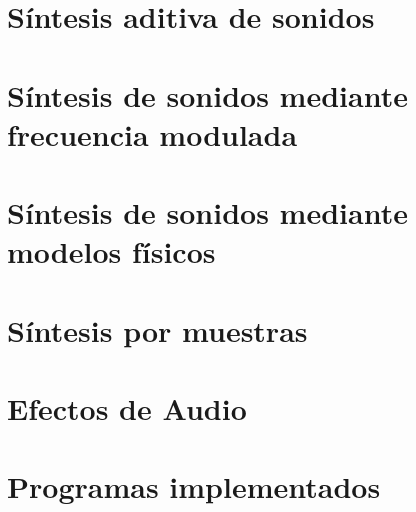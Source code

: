 







\tableofcontents
\newpage


\section{Síntesis aditiva de sonidos}
	\label{Ejercicio-2}
	

\section{Síntesis de sonidos mediante frecuencia modulada}
	\label{Ejercicio-3}
	

\section{Síntesis de sonidos mediante modelos físicos}
	\label{Ejercicio-4}
	

\section{Síntesis por muestras}
	\label{Ejercicio-5}
	

\section{Efectos de Audio}
	\label{Ejercicio-6}
	

%	

\section{Programas implementados}
	\label{Ejercicio-8}
	



